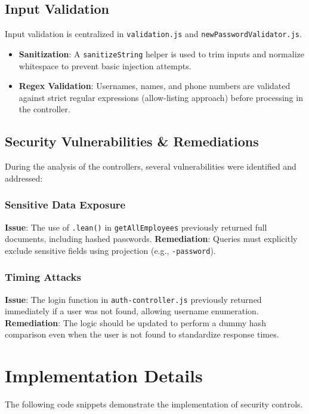\documentclass[11pt]{article}
\begin{document}
\subsection{Input Validation}
Input validation is centralized in \texttt{validation.js} and \texttt{newPasswordValidator.js}.
\begin{itemize}
    \item \textbf{Sanitization}: A \texttt{sanitizeString} helper is used to trim inputs and normalize whitespace to prevent basic injection attempts.
    \item \textbf{Regex Validation}: Usernames, names, and phone numbers are validated against strict regular expressions (allow-listing approach) before processing in the controller.
\end{itemize}

\subsection{\texorpdfstring{Security Vulnerabilities \& Remediations}{Security Vulnerabilities and Remediations}}

During the analysis of the controllers, several vulnerabilities were identified and addressed:

\subsubsection{Sensitive Data Exposure}
\textbf{Issue}: The use of \texttt{.lean()} in \texttt{getAllEmployees} previously returned full documents, including hashed passwords.
\textbf{Remediation}: Queries must explicitly exclude sensitive fields using projection (e.g., \texttt{-password}).

\subsubsection{Timing Attacks}
\textbf{Issue}: The login function in \texttt{auth-controller.js} previously returned immediately if a user was not found, allowing username enumeration.
\textbf{Remediation}: The logic should be updated to perform a dummy hash comparison even when the user is not found to standardize response times.

\section{Implementation Details}
The following code snippets demonstrate the implementation of security controls.
\end{document}
